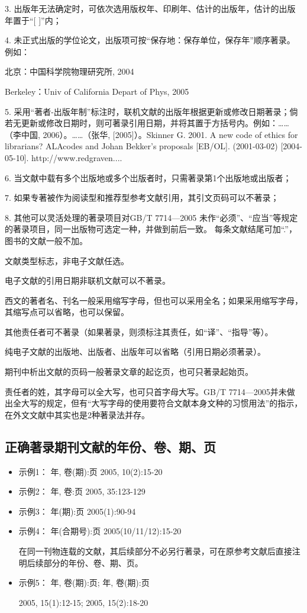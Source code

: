 3. 出版年无法确定时，可依次选用版权年、印刷年、估计的出版年，估计的出版年置于“[  ]”内；

4. 未正式出版的学位论文，出版项可按“保存地：保存单位，保存年”顺序著录。例如：

北京：中国科学院物理研究所, 2004

Berkeley：Univ of California Depart of Phys, 2005

5. 采用“著者-出版年制”标注时，联机文献的出版年根据更新或修改日期著录；倘若无更新或修改日期时，则可著录引用日期，并将其置于方括号内。例如：……（李中国, 2006）。……（张华, [2005]）。Skinner G. 2001. A new code of ethics for librarians? ALAcodes and Johan Bekker’s proposals [EB/OL]. (2001-03-02) [2004-05-10]. http://www.redgraven....

6. 当文献中载有多个岀版地或多个岀版者时，只需著录第1个出版地或出版者；

7. 如果专著被作为阅读型和推荐型参考文献引用，其引文页码可以不著录；

8. 其他可以灵活处理的著录项目对GB/T 7714—2005 未作“必须”、“应当”等规定的著录项目，同一出版物可选定一种，并做到前后一致。
每条文献结尾可加“.”，图书的文献一般不加。

文献类型标志，非电子文献任选。

电子文献的引用日期非联机文献可以不著录。

西文的著者名、刊名一般采用缩写字母，但也可以采用全名；如果采用缩写字母，其缩写点可以省略，也可以保留。

其他责任者可不著录（如果著录，则须标注其责任，如“译”、“指导”等）。

纯电子文献的出版地、出版者、出版年可以省略（引用日期必须著录）。

期刊中析出文献的页码一般著录文章的起讫页，也可只著录起始页。

责任者的姓，其字母可以全大写，也可只首字母大写。GB/T 7714—2005并未做出全大写的规定，但有“大写字母的使用要符合文献本身文种的习惯用法”的指示，在外文文献中其实也是2种著录法并存。

\subsection{正确著录期刊文献的年份、卷、期、页}

\begin{itemize}
  \item 示例1：   年, 卷(期):页  2005, 10(2):15-20 
  \item 示例2：   年, 卷:页   2005, 35:123-129 
  \item 示例3：   年(期):页   2005(1):90-94   
  \item 示例4：   年(合期号):页  2005(10/11/12):15-20
  
  在同一刊物连载的文献，其后续部分不必另行著录，可在原参考文献后直接注明后续部分的年份、卷、期、页。
  
  \item 示例5：  年, 卷(期):页; 年, 卷(期):页
  
  2005, 15(1):12-15; 2005, 15(2):18-20
\end{itemize}

